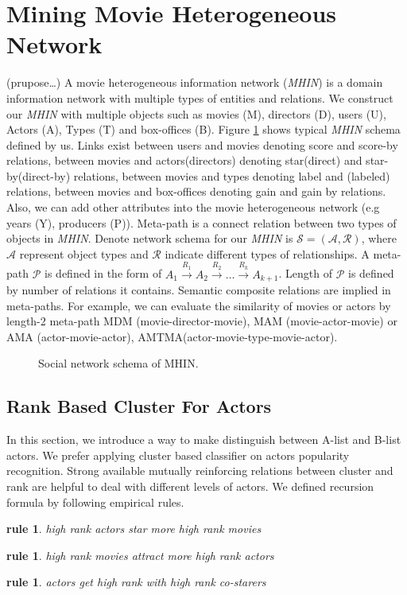\section{Mining Movie Heterogeneous Network}
\par (prupose\dots) A movie heterogeneous information network (\emph{MHIN}) is a domain information network with multiple types of entities and relations. We construct our \emph{MHIN} with multiple objects such as movies (M), directors (D), users (U), Actors (A), Types (T) and box-offices (B). Figure \ref{fig:mhin} shows typical \emph{MHIN} schema defined by us. Links exist between users and movies denoting score and score-by relations, between movies and actors(directors) denoting star(direct) and star-by(direct-by) relations, between movies and types denoting label and (labeled) relations, between movies and box-offices denoting gain and gain by relations. Also, we can add other attributes into the movie heterogeneous network (e.g years (Y), producers (P)). Meta-path is a connect relation between two types of objects in \emph{MHIN}. Denote network schema for our \emph{MHIN} is $\mathcal{S}=(\mathcal{A}, \mathcal{R})$, where $\mathcal{A}$ represent object types and $\mathcal{R}$ indicate different types of relationships. A meta-path $\mathcal{P}$ is defined in the form of $A_1 \xrightarrow{R_1} A_2\xrightarrow{R_2} \dots\xrightarrow{R_k} A_{k+1}$. Length of $\mathcal{P}$ is defined by number of relations it contains. Semantic composite relations are implied in meta-paths. For example, we can evaluate the similarity of movies or actors by length-2 meta-path MDM (movie-director-movie), MAM (movie-actor-movie) or AMA (actor-movie-actor), AMTMA(actor-movie-type-movie-actor).

\begin{figure}[!htbp]
\centering
{}
\caption{Social network schema of MHIN.}
\label{fig:mhin}
\end{figure}

\subsection{Rank Based Cluster For Actors}
In this section, we introduce a way to make distinguish between A-list and B-list actors. We prefer applying cluster based classifier on actors popularity recognition. Strong available mutually reinforcing relations between cluster and rank are helpful to deal with different levels of actors. We defined recursion formula by following empirical rules.
\newtheorem{rules}[theorem]{rule}
\begin{rules} high rank actors star more high rank movies\end{rules}
\begin{rules} high rank movies attract more high rank actors\end{rules}
\begin{rules} actors get high rank with high rank co-starers\end{rules}

